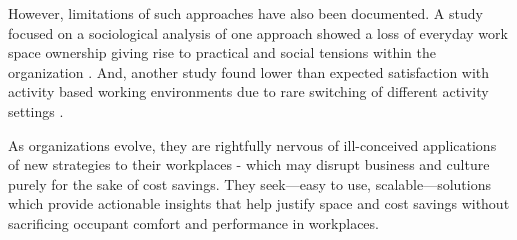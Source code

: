 \documentclass[]{interact}
\theoremstyle{plain}%
\theoremstyle{definition}
\theoremstyle{remark}
\begin{document}
However, limitations of such approaches have also been documented. A study focused on a sociological analysis of one approach showed a loss of everyday work space ownership giving rise to practical and social tensions within the organization \cite{Hirst2011SettlersHot-desking}. And, another study found lower than expected satisfaction with activity based working environments due to rare switching of different activity settings \citep{Hoendervanger2016FlexibilityEnvironments}. 


As organizations evolve, they are rightfully nervous of ill-conceived applications of new strategies to their workplaces - which may disrupt business and culture purely for the sake of cost savings. They seek---easy to use, scalable---solutions which provide actionable insights that help justify space and cost savings without sacrificing occupant comfort and performance in workplaces. 



\end{document}
